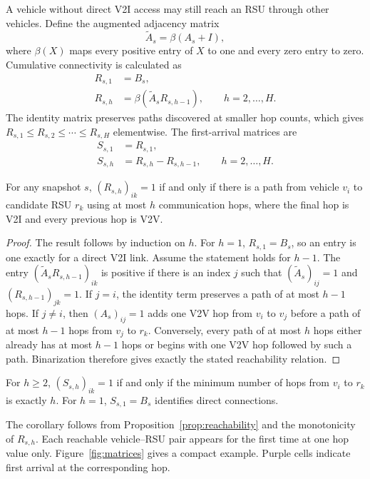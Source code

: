 \documentclass[engproc,proceedingpaper,submit,oneauthor]{Definitions/mdpi}
\newcommand{\Atil}{\widetilde{A}}
\newcommand{\binop}[1]{\beta\!\left(#1\right)}
\begin{document}
A vehicle without direct V2I access may still reach an RSU through other vehicles. Define the augmented adjacency matrix
\[
\Atil_s=\binop{A_s+I},
\]
where $\beta(X)$ maps every positive entry of $X$ to one and every zero entry to zero. Cumulative connectivity is calculated as
\begin{align}
R_{s,1} &= B_s,\label{eq:r1}\\
R_{s,h} &= \binop{\Atil_s R_{s,h-1}},\qquad h=2,\ldots,H.\label{eq:rh}
\end{align}
The identity matrix preserves paths discovered at smaller hop counts, which gives
$R_{s,1}\le R_{s,2}\le\cdots\le R_{s,H}$ elementwise. The first-arrival matrices are
\begin{align}
S_{s,1}&=R_{s,1},\\
S_{s,h}&=R_{s,h}-R_{s,h-1},\qquad h=2,\ldots,H.\label{eq:sh}
\end{align}

\begin{Proposition}\label{prop:reachability}
For any snapshot $s$, $(R_{s,h})_{ik}=1$ if and only if there is a path from vehicle $v_i$ to candidate RSU $r_k$ using at most $h$ communication hops, where the final hop is V2I and every previous hop is V2V.
\end{Proposition}

\begin{proof}
The result follows by induction on $h$. For $h=1$, $R_{s,1}=B_s$, so an entry is one exactly for a direct V2I link. Assume the statement holds for $h-1$. The entry $(\Atil_sR_{s,h-1})_{ik}$ is positive if there is an index $j$ such that $(\Atil_s)_{ij}=1$ and $(R_{s,h-1})_{jk}=1$. If $j=i$, the identity term preserves a path of at most $h-1$ hops. If $j\ne i$, then $(A_s)_{ij}=1$ adds one V2V hop from $v_i$ to $v_j$ before a path of at most $h-1$ hops from $v_j$ to $r_k$. Conversely, every path of at most $h$ hops either already has at most $h-1$ hops or begins with one V2V hop followed by such a path. Binarization therefore gives exactly the stated reachability relation.
\end{proof}

\begin{Corollary}\label{cor:minhop}
For $h\ge2$, $(S_{s,h})_{ik}=1$ if and only if the minimum number of hops from $v_i$ to $r_k$ is exactly $h$. For $h=1$, $S_{s,1}=B_s$ identifies direct connections.
\end{Corollary}

The corollary follows from Proposition~\ref{prop:reachability} and the monotonicity of $R_{s,h}$. Each reachable vehicle--RSU pair appears for the first time at one hop value only. Figure~\ref{fig:matrices} gives a compact example. Purple cells indicate first arrival at the corresponding hop.
\end{document}
